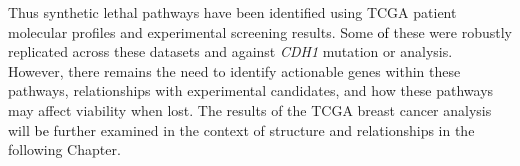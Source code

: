 
Thus \gls{synthetic lethal} \glspl{pathway} have been identified using \gls{TCGA} patient molecular profiles %
and experimental screening results. Some \textcolor{black}{of} these were robustly replicated across these datasets and against \textit{CDH1} \gls{mutation} or  analysis. However, there remains the need to identify actionable genes within these \glspl{pathway}, relationships with experimental candidates, and how these \glspl{pathway} may affect viability when lost. 
The results of the \gls{TCGA} breast cancer analysis will \textcolor{black}{be} further examined in the context of  structure and relationships in the following Chapter.


